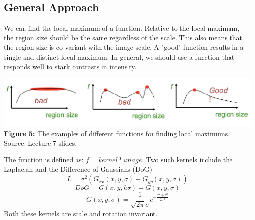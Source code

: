 \documentclass{article}
\begin{document}
\subsection{General Approach}
We can find the local maximum of a function. Relative to the local maximum, the region size should be the same regardless of the scale. This also means that the region size is co-variant with the image scale. A "good" function results in a single and distinct local maximum. In general, we should use a function that responds well to stark contrasts in intensity. \\
\begin{center}
	\includegraphics[scale=0.5]{scaleinvariant.png}\\
    \textbf{Figure 5:} The examples of different functions for finding local maximums. Source: Lecture 7 slides.
\end{center}
The function is defined as: $f = kernel*image$. Two such kernels include the Laplacian and the Difference of Gaussians (DoG). $$L = \sigma^2(G_{xx}(x,y,\sigma)+G_{yy}(x,y,\sigma))$$ $$DoG = G(x,y,k\sigma) - G(x,y,\sigma)$$ $$G(x,y,\sigma) = \frac{1}{\sqrt{2\pi}\sigma}e^{-\frac{x^2+y^2}{2\sigma^2}}$$
Both these kernels are scale and rotation invariant.




\small


\end{document}
